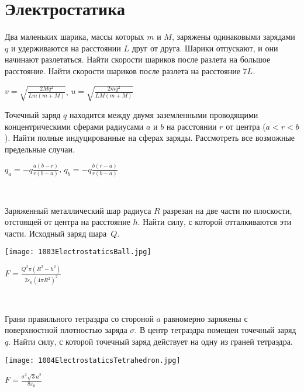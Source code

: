\section{Электростатика}

\begin{ex}
Два маленьких шарика, массы которых $m$ и $M$, заряжены одинаковыми зарядами $q$ и удерживаются на расстоянии $L$ друг от друга. Шарики отпускают, и они начинают разлетаться. Найти скорости шариков после разлета на большое расстояние. Найти скорости шариков после разлета на расстояние $7L$.
\begin{ans}
$v = \sqrt{\frac{2Mq^2}{Lm(m+M)}}$, $u = \sqrt{\frac{2mq^2}{LM(m+M)}}$
\end{ans}
\end{ex}

\begin{ex}
Точечный заряд $q$ находится между двумя заземленными проводящими концентрическими сферами 
радиусами $a$ и $b$ на расстоянии $r$ от центра ($a<r<b$). 
Найти полные индуцированные на сферах заряды. Рассмотреть все возможные предельные случаи.
\begin{ans}
$q_a = -q\frac{a(b-r)}{r(b-a)}$, $q_b = -q\frac{b(r-a)}{r(b-a)}$
\end{ans}
\end{ex}

\begin{ex}
\hspace{0pt} \\
\begin{minipage}{.65\textwidth}
Заряженный металлический шар радиуса $R$ разрезан на две части по плоскости, отстоящей от центра на расстояние $h$. 
Найти силу, с которой отталкиваются эти части. Исходный заряд шара~$Q$.
\end{minipage}
\begin{minipage}{.35\textwidth}
\centering
\texttt{[image: 1003ElectrostaticsBall.jpg]}
\end{minipage}
\begin{ans}
$F = \frac{Q^2 \pi (R^2-h^2)}{2 \varepsilon_0 {(4 \pi R^2)}^2}$
\end{ans}
\end{ex}

\begin{ex}
\hspace{0pt} \\
\begin{minipage}{.65\textwidth}
Грани правильного тетраэдра со стороной $a$ равномерно заряжены с поверхностной плотностью заряда $\sigma$. 
В центр тетраэдра помещен точечный заряд $q$. Найти силу, с которой точечный заряд действует на одну из граней тетраэдра.
\end{minipage}
\begin{minipage}{.35\textwidth}
\centering
\texttt{[image: 1004ElectrostaticsTetrahedron.jpg]}
\end{minipage}
\begin{ans}
$F = \frac{\sigma^2 \sqrt{3}a^2}{8\varepsilon_0}$
\end{ans}
\end{ex}

